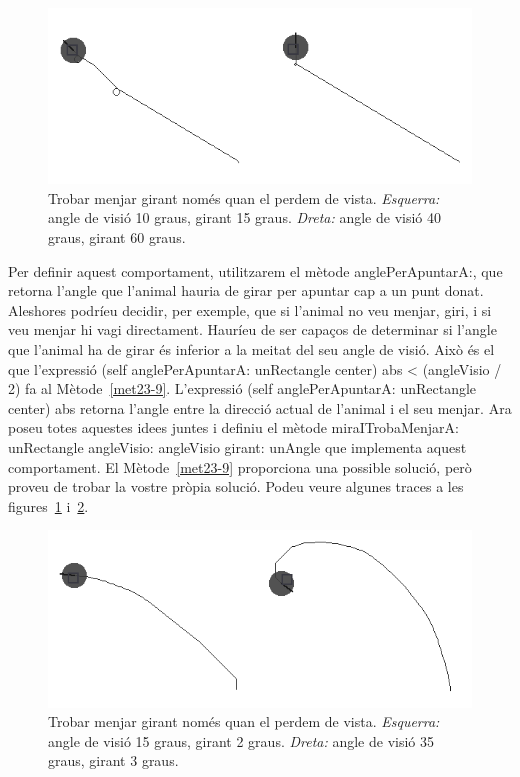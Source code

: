 \begin{figure}[h!]
\begin{center}
\includegraphics[scale=2]{Imatges/figura23-16}
\end{center}
\caption{Trobar menjar girant només quan el perdem de vista. \emph{Esquerra:} angle de visió 10 graus, girant 15 graus. \emph{Dreta:} angle de visió 40 graus, girant 60 graus.}
\label{fig2316}
\end{figure}

Per definir aquest comportament, utilitzarem el mètode \textsf{anglePerApuntarA:}, que retorna l'angle que l'animal hauria de girar per apuntar cap a un punt donat. Aleshores podríeu decidir, per exemple, que si l'animal no veu menjar, giri, i si veu menjar hi vagi directament. Hauríeu de ser capaços de determinar si l'angle que l'animal ha de girar és inferior a la meitat del seu angle de visió. Això és el que l'expressió \textsf{(self anglePerApuntarA: unRectangle center) abs \textless \hspace*{1mm} (angleVisio / 2) } fa al Mètode~\ref{met23-9}. L'expressió \textsf{(self anglePerApuntarA: unRectangle center) abs} retorna l'angle entre la direcció actual de l'animal i el seu menjar. Ara poseu totes aquestes idees juntes i definiu el mètode \textsf{miraITrobaMenjarA: unRectangle angleVisio: angleVisio girant: unAngle} que implementa aquest comportament. El Mètode~\ref{met23-9} proporciona una possible solució, però proveu de trobar la vostre pròpia solució. Podeu veure algunes traces a les figures~\ref{fig2316} i~\ref{fig2317}.
\begin{figure}[h!]
\begin{center}
\includegraphics[scale=2]{Imatges/figura23-17}
\end{center}
\caption{Trobar menjar girant només quan el perdem de vista. \emph{Esquerra:} angle de visió 15 graus, girant 2 graus. \emph{Dreta:} angle de visió 35 graus, girant 3 graus.}
\label{fig2317}
\end{figure}

